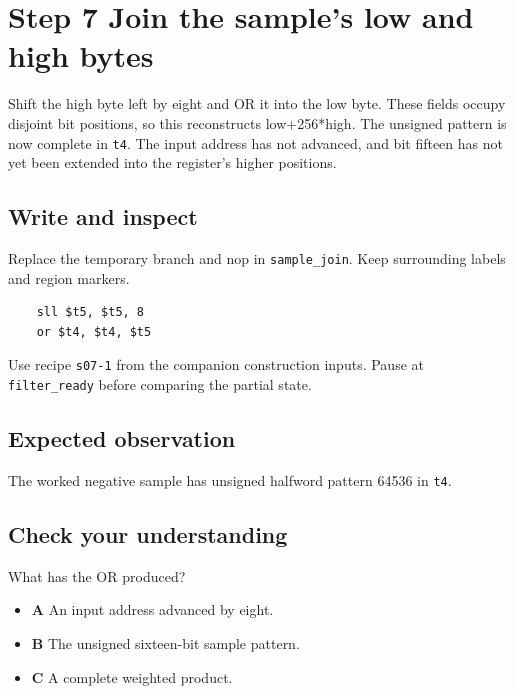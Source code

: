 \section{Step 7 Join the sample’s low and high bytes}\label{fir-s07}

Shift the high byte left by eight and OR it into the low byte. These fields occupy disjoint bit positions, so this reconstructs low+256*high. The unsigned pattern is now complete in \texttt{t4}. The input address has not advanced, and bit fifteen has not yet been extended into the register’s higher positions.

\subsection{Write and inspect}
Replace the temporary branch and nop in \texttt{sample\_join}. Keep surrounding labels and region markers.

\begin{verbatim}
    sll $t5, $t5, 8
    or $t4, $t4, $t5
\end{verbatim}
Use recipe \texttt{s07-1} from the companion construction inputs. Pause at \texttt{filter\_ready} before comparing the partial state.

\subsection{Expected observation}
The worked negative sample has unsigned halfword pattern 64536 in \texttt{t4}.

\subsection{Check your understanding}
What has the OR produced?

\begin{itemize}
  \item \textbf{A} An input address advanced by eight.
  \item \textbf{B} The unsigned sixteen-bit sample pattern.
  \item \textbf{C} A complete weighted product.
\end{itemize}
